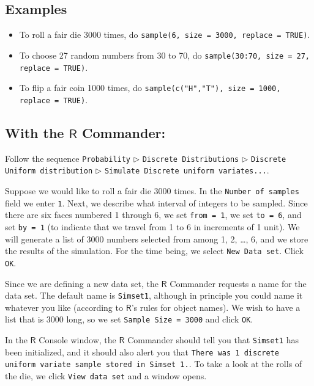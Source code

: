 \documentclass[captions=tableheading]{scrbook}
\begin{document}
\subsection{Examples}
\label{sec-5-2-3}

\begin{itemize}
\item To roll a fair die 3000 times, do \texttt{sample(6, size = 3000, replace = TRUE)}.
\item To choose 27 random numbers from 30 to 70, do \texttt{sample(30:70, size = 27, replace = TRUE)}.
\item To flip a fair coin 1000 times, do \texttt{sample(c("H","T"), size = 1000, replace = TRUE)}.
\end{itemize}
\subsection{With the \(\mathsf{R}\) Commander:}
\label{sec-5-2-4}


Follow the sequence \texttt{Probability} \(\triangleright\) \texttt{Discrete Distributions} \(\triangleright\) \texttt{Discrete Uniform distribution} \(\triangleright\) \texttt{Simulate Discrete uniform variates...}.

Suppose we would like to roll a fair die 3000 times. In the \texttt{Number of samples} field we enter \texttt{1}. Next, we describe what interval of integers to be sampled. Since there are six faces numbered 1 through 6, we set \texttt{from = 1}, we set \texttt{to = 6}, and set \texttt{by = 1} (to indicate that we travel from 1 to 6 in increments of 1 unit). We will generate a list of 3000 numbers selected from among 1, 2, \ldots{}, 6, and we store the results of the simulation. For the time being, we select \texttt{New Data set}. Click \texttt{OK}.

Since we are defining a new data set, the \(\mathsf{R}\) Commander requests a name for the data set. The default name is \texttt{Simset1}, although in principle you could name it whatever you like (according to \(\mathsf{R}\)'s rules for object names). We wish to have a list that is 3000 long, so we set \texttt{Sample Size = 3000} and click \texttt{OK}.

In the \(\mathsf{R}\) Console window, the \(\mathsf{R}\) Commander should tell you that \texttt{Simset1} has been initialized, and it should also alert you that \texttt{There was 1 discrete uniform variate sample stored in Simset 1.}. To take a look at the rolls of the die, we click \texttt{View data set} and a window opens.  
\end{document}
